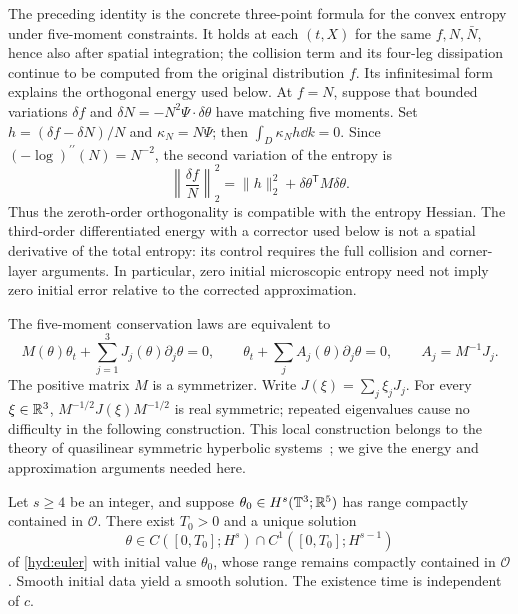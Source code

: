 The preceding identity is the concrete three-point formula for the convex
entropy under five-moment constraints. It holds at each $(t,X)$ for the
same $f,N,\bar N$, hence also after spatial integration; the collision
term and its four-leg dissipation continue to be computed from the
original distribution $f$. Its infinitesimal form explains the
orthogonal energy used below. At $f=N$, suppose that bounded variations
$\delta f$ and $\delta N=-N^2\Psi\cdot\delta\theta$ have matching five
moments. Set $h=(\delta f-\delta N)/N$ and $\kappa_N=N\Psi$; then
$\int_D\kappa_Nh\dd k=0$. Since
$(-\log)^{\prime\prime}(N)=N^{-2}$, the second variation of the entropy is
\[
 \left\|\frac{\delta f}{N}\right\|_2^2
 =\|h\|_2^2+\delta\theta^{\mathsf T}M\delta\theta.
\]
Thus the zeroth-order orthogonality is compatible with the entropy
Hessian. The third-order differentiated energy with a corrector used
below is not a spatial derivative of the total entropy: its control
requires the full collision and corner-layer arguments. In particular,
zero initial microscopic entropy need not imply zero initial error
relative to the corrected approximation.

The five-moment conservation laws are equivalent to
\begin{equation}\label{hyd:euler}
 M(\theta)\theta_t+\sum_{j=1}^3J_j(\theta)\partial_j\theta=0,
 \qquad
 \theta_t+\sum_j A_j(\theta)\partial_j\theta=0,
 \qquad A_j=M^{-1}J_j.
\end{equation}
The positive matrix $M$ is a symmetrizer. Write
$J(\xi)=\sum_j\xi_jJ_j$. For every $\xi\in\mathbb R^3$,
$M^{-1/2}J(\xi)M^{-1/2}$ is real symmetric; repeated eigenvalues cause
no difficulty in the following construction. This local construction
belongs to the theory of quasilinear symmetric hyperbolic
systems~\cite{Kato1975}; we give the energy and approximation arguments
needed here.

\begin{proposition}\label{hyd:euler-local}
 Let $s\ge4$ be an integer, and suppose
 $\theta_0\in H^s(\mathbb T^3;\mathbb R^5)$ has range compactly contained in
 $\mathcal O$. There exist $T_0>0$ and a unique solution
 \[
 \theta\in C([0,T_0];H^s)\cap C^1([0,T_0];H^{s-1})
 \]
 of \eqref{hyd:euler} with initial value $\theta_0$, whose range remains
 compactly contained in $\mathcal O$. Smooth initial data yield a smooth
 solution. The existence time is independent of $c$.
\end{proposition}

